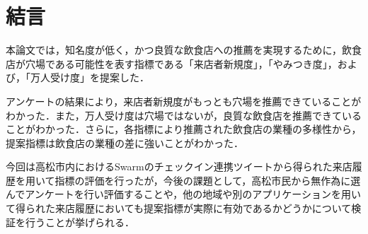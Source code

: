 \chapter{結言}
\label{chap:conclusion}

 本論文では，知名度が低く，かつ良質な飲食店への推薦を実現するために，飲食店が穴場である可能性を表す指標である「来店者新規度」，「やみつき度」，および，「万人受け度」を提案した．\par
アンケートの結果により，来店者新規度がもっとも穴場を推薦できていることがわかった．また，万人受け度は穴場ではないが，良質な飲食店を推薦できていることがわかった．さらに，各指標により推薦された飲食店の業種の多様性から，提案指標は飲食店の業種の差に強いことがわかった．\par
今回は高松市内におけるSwarmのチェックイン連携ツイートから得られた来店履歴を用いて指標の評価を行ったが，今後の課題として，高松市民から無作為に選んでアンケートを行い評価することや，他の地域や別のアプリケーションを用いて得られた来店履歴においても提案指標が実際に有効であるかどうかについて検証を行うことが挙げられる．\par
